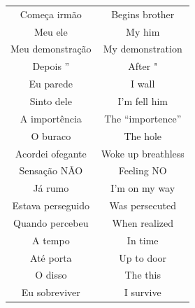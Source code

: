 \documentclass[12pt,fleqn]{article}
\begin{document}
\begin{table}[H]
\begin{tabular}{  c | c }
Começa irmão                     &                                                Begins brother          \\
Meu ele                          &                                                My him                  \\
Meu demonstração                 &                                                My demonstration        \\
Depois ”                         &                                                After "                 \\
Eu parede                        &                                                I wall                  \\
Sinto dele                       &                                                I'm fell him            \\
A importência                    &                                                The ``importence''      \\
O buraco                         &                                                The hole                \\
Acordei ofegante                 &                                                Woke up breathless    \\
Sensação NÃO                     &                                                Feeling NO              \\
Já rumo                          &                                                I'm on my way           \\
Estava perseguido                &                                                Was persecuted          \\
Quando percebeu                  &                                                When realized    \\
A tempo                          &                                                In time                 \\
Até porta                        &                                                Up to door              \\
O disso                          &                                                The this                    \\
Eu sobreviver                    &                                                I survive               \\
\end{tabular}
\end{table}
\end{document}
